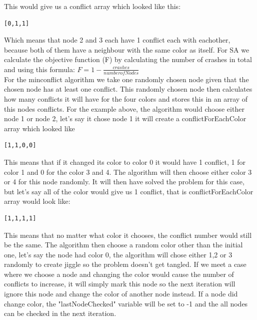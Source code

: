 \documentclass[12pt, a4paper]{article}
\begin{document}
This would give us a conflict array which looked like this:
\begin{center}
\begin{verbatim}
[0,1,1]
\end{verbatim}
\end{center}
Which means that node 2 and 3 each have 1 conflict each with eachother, because both of them have a neighbour with the same color as itself. For SA we calculate the objective function (F) by calculating the number of crashes in total and using this formula: $F = 1- \frac{crashes}{number of Nodes}$ \\
For the minconflict algorithm we take one randomly chosen node given that the chosen node has at least one conflict. This randomly chosen node then calculates how many conflicts it will have for the four colors and stores this in an array of this nodes conflicts. For the example above, the algorithm would choose either node 1 or node 2, let's say it chose node 1 it will create a conflictForEachColor array which looked like
\begin{verbatim}
[1,1,0,0]
\end{verbatim} 
This means that if it changed its color to color 0 it would have 1 conflict, 1 for color 1 and 0 for the color 3 and 4. The algorithm will then choose either color 3 or 4 for this node randomly. It will then have solved the problem for this case, but let's say all of the color would give us 1 conflict, that is conflictForEachColor array would look like:
\begin{verbatim}
[1,1,1,1]
\end{verbatim}
This means that no matter what color it chooses, the conflict number would still be the same. The algorithm then choose a random color other than the initial one, let's say the node had color 0, the algorithm will chose either 1,2 or 3 randomly to create jiggle so the problem doesn't get tangled.
If we meet a case where we choose a node and changing the color would cause the number of conflicts to increase, it will simply mark this node so the next iteration will ignore this node and change the color of another node instead. If a node did change color, the "lastNodeChecked" variable will be set to -1 and the all nodes can be checked in the next iteration.
\end{document}
